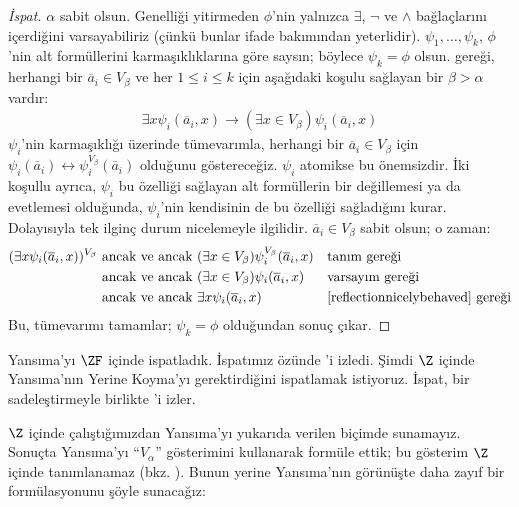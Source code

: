 \begin{proof}[İspat] 
$\alpha$ sabit olsun. Genelliği yitirmeden $\phi$'nin yalnızca $\exists$,
$\lnot$ ve $\land$ bağlaçlarını içerdiğini varsayabiliriz (çünkü bunlar ifade
bakımından yeterlidir). $\psi_1, \ldots, \psi_k$, $\phi$'nin alt formüllerini
karmaşıklıklarına göre saysın; böylece $\psi_k = \phi$ olsun.
 gereği, herhangi bir $\overline{a}_i \in V_\beta$ ve
her $1 \leq i \leq k$ için aşağıdaki koşulu sağlayan bir
$\beta > \alpha$ vardır:
\begin{align}\label{reflectionnicelybehaved}
	\exists x\psi_i(\overline{a}_i, x) \rightarrow 
	(\exists x \in V_\beta) \psi_i(\overline{a}_i, x)\tag{*}
\end{align}
$\psi_i$'nin karmaşıklığı üzerinde tümevarımla, herhangi bir
$\overline{a}_i \in V_\beta$ için
$\psi_i(\overline{a}_i) \leftrightarrow
\psi_i^{V_\beta}(\overline{a}_i)$ olduğunu göstereceğiz. $\psi_i$ atomikse
bu önemsizdir. İki koşullu ayrıca, $\psi_i$ bu özelliği sağlayan alt
formüllerin bir değillemesi ya da evetlemesi olduğunda, $\psi_i$'nin
kendisinin de bu özelliği sağladığını kurar. Dolayısıyla tek ilginç durum
nicelemeyle ilgilidir.
$\overline{a}_i \in V_\beta$ sabit olsun; o zaman:
\begin{align*}
	(\exists x \psi_i(\overline{a}_i, x))^{V_\beta}
	&\text{ ancak ve ancak }
	(\exists x \in V_\beta)\psi_i^{V_\beta}(\overline{a}_i, x)
	&&\text{tanım gereği}\\
	&\text{ ancak ve ancak }
	(\exists x \in V_\beta)\psi_i(\overline{a}_i,  x)
	&&\text{varsayım gereği}\\
	&\text{ ancak ve ancak }
	\exists x \psi_i(\overline{a}_i, x)
	&&\text{\eqref{reflectionnicelybehaved} gereği}
\end{align*}
Bu, tümevarımı tamamlar; $\psi_k = \phi$ olduğundan sonuç çıkar.
\end{proof}

Yansıma'yı $\ZF$ içinde ispatladık. İspatımız özünde
\citet{Montague1961}'i izledi. Şimdi $\Z$ içinde Yansıma'nın Yerine Koyma'yı
gerektirdiğini ispatlamak istiyoruz. İspat, bir sadeleştirmeyle birlikte
\citet{Levy1960}'i izler.

$\Z$ içinde çalıştığımızdan Yansıma'yı yukarıda verilen biçimde sunamayız.
Sonuçta Yansıma'yı ``$V_\alpha$'' gösterimini kullanarak formüle ettik; bu
gösterim $\Z$ içinde tanımlanamaz (bkz. ). Bunun
yerine Yansıma'nın görünüşte daha zayıf bir formülasyonunu şöyle sunacağız:

